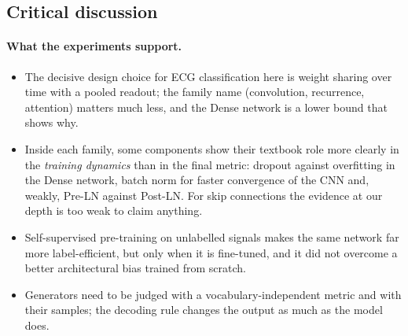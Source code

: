 \subsection{Critical discussion}

\paragraph{What the experiments support.}
\begin{itemize}[leftmargin=1.2em,itemsep=1pt]
  \item The decisive design choice for ECG classification here is weight sharing over time with a
        pooled readout; the family name (convolution, recurrence, attention) matters much less, and the
        Dense network is a lower bound that shows why.
  \item Inside each family, some components show their textbook role more clearly in the
        \emph{training dynamics} than in the final metric: dropout against overfitting in the Dense
        network, batch norm for faster convergence of the CNN and, weakly, Pre-LN against Post-LN. For
        skip connections the evidence at our depth is too weak to claim anything.
  \item Self-supervised pre-training on unlabelled signals makes the same network far more
        label-efficient, but only when it is fine-tuned, and it did not overcome a better architectural
        bias trained from scratch.
  \item Generators need to be judged with a vocabulary-independent metric and with their samples; the
        decoding rule changes the output as much as the model does.
\end{itemize}

